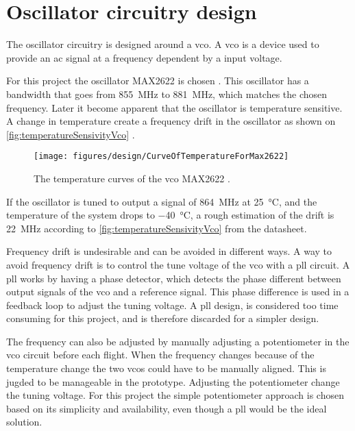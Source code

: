 \section{Oscillator circuitry design}\label{sec:designOscillator}
The oscillator circuitry is designed around a \gls{vco}. A \gls{vco} is a device used to provide an \gls{ac} signal at a frequency dependent by a input voltage.


For this project the oscillator MAX2622 is chosen \citep{datasheet:MAX2622}. This oscillator has a bandwidth that goes from \SI{855}{\mega\hertz} to \SI{881}{\mega\hertz}, which matches the chosen frequency. Later it become apparent that the oscillator is temperature sensitive. A change in temperature create a frequency drift in the oscillator as shown on \autoref{fig:temperatureSensivityVco} \citep{datasheet:MAX2622}.
\begin{figure}[h]
	\centering
	\texttt{[image: figures/design/CurveOfTemperatureForMax2622]}
	\caption{The temperature curves of the \gls{vco} MAX2622 \citep{datasheet:MAX2622}. }
	\label{fig:temperatureSensivityVco}
\end{figure} 

If the oscillator is tuned to output a signal of \SI{864}{\mega\hertz} at \SI{25}{\degreeCelsius}, and the temperature of the system drops to \SI{-40}{\degreeCelsius}, a rough estimation of the drift is \SI{22}{\mega\hertz} according to \autoref{fig:temperatureSensivityVco} from the datasheet. 

Frequency drift is undesirable and can be avoided in different ways. A way to avoid frequency drift is to control the tune voltage of the \gls{vco}  with a \gls{pll} circuit. A \gls{pll} works by having a phase detector, which detects the phase different between output signals of the \gls{vco} and a reference signal. This phase difference is used in a feedback loop to adjust the tuning voltage. A \gls{pll} design, is considered too time consuming for this project, and is therefore discarded for a simpler design.

The frequency can also be adjusted by manually adjusting a potentiometer in the \gls{vco} circuit before each flight. When the frequency changes because of the temperature change the two \gls{vco}s could have to be manually aligned. This is jugded to be manageable in the prototype. Adjusting the potentiometer change the tuning voltage. For this project the simple potentiometer approach is chosen based on its simplicity and availability, even though a \gls{pll} would be the ideal solution. 

